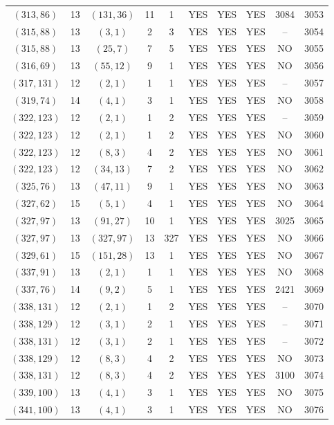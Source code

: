 \begin{longtable}{|c|c|c|c|c|c|c|c|c|c|}
$(313, 86)$ & 13 & $(131, 36)$ & 11 & 1 & YES & YES & YES & 3084 & 3053\\
$(315, 88)$ & 13 & $(3, 1)$ & 2 & 3 & YES & YES & YES & -- & 3054\\
$(315, 88)$ & 13 & $(25, 7)$ & 7 & 5 & YES & YES & YES & NO & 3055\\
$(316, 69)$ & 13 & $(55, 12)$ & 9 & 1 & YES & YES & YES & NO & 3056\\
$(317, 131)$ & 12 & $(2, 1)$ & 1 & 1 & YES & YES & YES & -- & 3057\\
$(319, 74)$ & 14 & $(4, 1)$ & 3 & 1 & YES & YES & YES & NO & 3058\\
$(322, 123)$ & 12 & $(2, 1)$ & 1 & 2 & YES & YES & YES & -- & 3059\\
$(322, 123)$ & 12 & $(2, 1)$ & 1 & 2 & YES & YES & YES & NO & 3060\\
$(322, 123)$ & 12 & $(8, 3)$ & 4 & 2 & YES & YES & YES & NO & 3061\\
$(322, 123)$ & 12 & $(34, 13)$ & 7 & 2 & YES & YES & YES & NO & 3062\\
$(325, 76)$ & 13 & $(47, 11)$ & 9 & 1 & YES & YES & YES & NO & 3063\\
$(327, 62)$ & 15 & $(5, 1)$ & 4 & 1 & YES & YES & YES & NO & 3064\\
$(327, 97)$ & 13 & $(91, 27)$ & 10 & 1 & YES & YES & YES & 3025 & 3065\\
$(327, 97)$ & 13 & $(327, 97)$ & 13 & 327 & YES & YES & YES & NO & 3066\\
$(329, 61)$ & 15 & $(151, 28)$ & 13 & 1 & YES & YES & YES & NO & 3067\\
$(337, 91)$ & 13 & $(2, 1)$ & 1 & 1 & YES & YES & YES & NO & 3068\\
$(337, 76)$ & 14 & $(9, 2)$ & 5 & 1 & YES & YES & YES & 2421 & 3069\\
$(338, 131)$ & 12 & $(2, 1)$ & 1 & 2 & YES & YES & YES & -- & 3070\\
$(338, 129)$ & 12 & $(3, 1)$ & 2 & 1 & YES & YES & YES & -- & 3071\\
$(338, 131)$ & 12 & $(3, 1)$ & 2 & 1 & YES & YES & YES & -- & 3072\\
$(338, 129)$ & 12 & $(8, 3)$ & 4 & 2 & YES & YES & YES & NO & 3073\\
$(338, 131)$ & 12 & $(8, 3)$ & 4 & 2 & YES & YES & YES & 3100 & 3074\\
$(339, 100)$ & 13 & $(4, 1)$ & 3 & 1 & YES & YES & YES & NO & 3075\\
$(341, 100)$ & 13 & $(4, 1)$ & 3 & 1 & YES & YES & YES & NO & 3076\\

\end{longtable}
